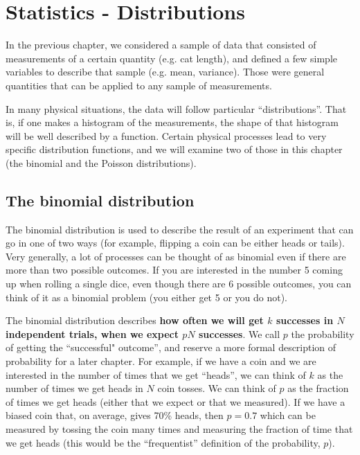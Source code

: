 
%
\chapter{Statistics - Distributions}
\label{chap:StatsDistributions}
In the previous chapter, we considered a sample of data that consisted of measurements of a certain quantity (e.g. cat length), and defined a few simple variables to describe that sample (e.g. mean, variance). Those were general quantities that can be applied to any sample of measurements.

In many physical situations, the data will follow particular ``distributions''. That is, if one makes a histogram of the measurements, the shape of that histogram will be well described by a function. Certain physical processes lead to very specific distribution functions, and we will examine two of those in this chapter (the binomial and the Poisson distributions).

\section{The binomial distribution}

The binomial distribution is used to describe the result of an experiment that can go in one of two ways (for example, flipping a coin can be either heads or tails). Very generally, a lot of processes can be thought of as binomial even if there are more than two possible outcomes. If you are interested in the number 5 coming up when rolling a single dice, even though there are 6 possible outcomes, you can think of it as a binomial problem (you either get 5 or you do not).

The binomial distribution describes \textbf{how often we will get $k$ successes in $N$ independent trials, when we expect $pN$ successes}. We call $p$ the probability of getting the ``successful" outcome'', and reserve a more formal description of probability for a later chapter. For example, if we have a coin and we are interested in the number of times that we get ``heads'', we can think of $k$ as the number of times we get heads in $N$ coin tosses. We can think of $p$ as the fraction of times we get heads (either that we expect or that we measured). If we have a biased coin that, on average, gives 70\% heads, then $p=0.7$ which can be measured by tossing the coin many times and measuring the fraction of time that we get heads (this would be the ``frequentist'' definition of the probability, $p$). 


